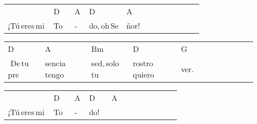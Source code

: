 \begin{multicols}{2}
\begin{minipage}{\columnwidth}
\noindent
\begin{tabular}{llllllllllll}
&D&A&D&A\\
¡Tú\,eres\,mi\,&To\,\,\,&-\,\,\,&do,\,oh\,Se&ñor!
\end{tabular}

\noindent
\begin{tabular}{llllllllllll}
D&A&Bm&D&G\\
\,\,De\,tu\,pre&sencia\,tengo\,&sed,\,solo\,tu\,&rostro\,quiero\,&ver.
\end{tabular}

\noindent
\begin{tabular}{llllllllllll}
&D&A&D&A\\
¡Tú\,eres\,mi\,&To\,\,\,&-\,\,\,&do!\,\,\,&
\end{tabular}
\end{minipage}\\


\chorus{}

\end{multicols}